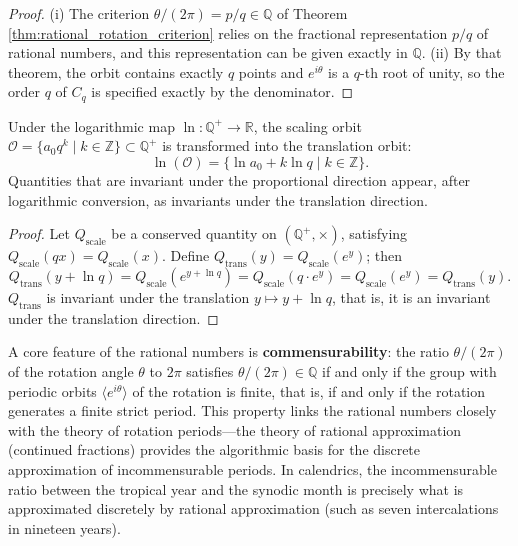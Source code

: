 \begin{proof}
(i) The criterion $\theta/(2\pi) = p/q \in \mathbb{Q}$ of Theorem \ref{thm:rational_rotation_criterion} relies on the fractional representation $p/q$ of rational numbers, and this representation can be given exactly in $\mathbb{Q}$.
(ii) By that theorem, the orbit contains exactly $q$ points and $e^{i\theta}$ is a $q$-th root of unity, so the order $q$ of $C_q$ is specified exactly by the denominator.
\end{proof}

\begin{proposition}\label{prop:rational_momentum}
Under the logarithmic map $\ln: \mathbb{Q}^+ \to \mathbb{R}$, the scaling orbit $\mathcal{O} = \{a_0 q^k \mid k \in \mathbb{Z}\} \subset \mathbb{Q}^+$ is transformed into the translation orbit:
\[
\ln(\mathcal{O}) = \{\ln a_0 + k \ln q \mid k \in \mathbb{Z}\}.
\]
Quantities that are invariant under the proportional direction appear, after logarithmic conversion, as invariants under the translation direction.
\end{proposition}

\begin{proof}
Let $Q_{\text{scale}}$ be a conserved quantity on $(\mathbb{Q}^+, \times)$, satisfying $Q_{\text{scale}}(q x) = Q_{\text{scale}}(x)$. Define $Q_{\text{trans}}(y) = Q_{\text{scale}}(e^y)$; then
\[
Q_{\text{trans}}(y + \ln q) = Q_{\text{scale}}(e^{y + \ln q}) = Q_{\text{scale}}(q \cdot e^y) = Q_{\text{scale}}(e^y) = Q_{\text{trans}}(y).
\]
$Q_{\text{trans}}$ is invariant under the translation $y \mapsto y + \ln q$, that is, it is an invariant under the translation direction.
\end{proof}

\begin{remark}
A core feature of the rational numbers is \textbf{commensurability}: the ratio $\theta/(2\pi)$ of the rotation angle $\theta$ to $2\pi$ satisfies $\theta/(2\pi) \in \mathbb{Q}$ if and only if the group with periodic orbits $\langle e^{i\theta}\rangle$ of the rotation is finite, that is, if and only if the rotation generates a finite strict period. This property links the rational numbers closely with the theory of rotation periods---the theory of rational approximation (continued fractions) provides the algorithmic basis for the discrete approximation of incommensurable periods. In calendrics, the incommensurable ratio between the tropical year and the synodic month is precisely what is approximated discretely by rational approximation (such as seven intercalations in nineteen years).
\end{remark}

